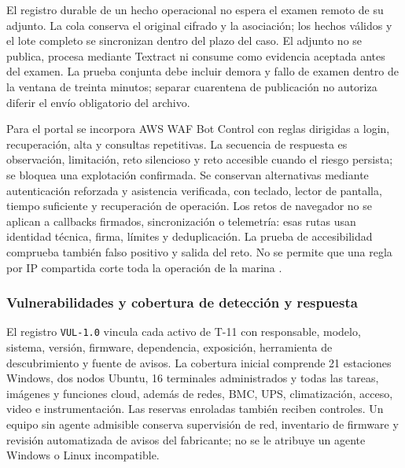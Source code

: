 El registro durable de un hecho operacional no espera el examen remoto de su adjunto. La cola conserva el original cifrado y la asociación; los hechos válidos y el lote completo se sincronizan dentro del plazo del caso. El adjunto no se publica, procesa mediante Textract ni consume como evidencia aceptada antes del examen. La prueba conjunta debe incluir demora y fallo de examen dentro de la ventana de treinta minutos; separar cuarentena de publicación no autoriza diferir el envío obligatorio del archivo.

Para el portal se incorpora AWS WAF Bot Control con reglas dirigidas a login, recuperación, alta y consultas repetitivas. La secuencia de respuesta es observación, limitación, reto silencioso y reto accesible cuando el riesgo persista; se bloquea una explotación confirmada. Se conservan alternativas mediante autenticación reforzada y asistencia verificada, con teclado, lector de pantalla, tiempo suficiente y recuperación de operación. Los retos de navegador no se aplican a callbacks firmados, sincronización o telemetría: esas rutas usan identidad técnica, firma, límites y deduplicación. La prueba de accesibilidad comprueba también falso positivo y salida del reto. No se permite que una regla por IP compartida corte toda la operación de la marina \parencites{sec-waf-bot,sec-waf-retos}.

\subsubsection{Vulnerabilidades y cobertura de detección y respuesta}
\label{sec:4-vulnerabilidades-rt}

El registro \texttt{VUL-1.0} vincula cada activo de T-11 con responsable, modelo, sistema, versión, firmware, dependencia, exposición, herramienta de descubrimiento y fuente de avisos. La cobertura inicial comprende 21 estaciones Windows, dos nodos Ubuntu, 16 terminales administrados y todas las tareas, imágenes y funciones cloud, además de redes, BMC, UPS, climatización, acceso, video e instrumentación. Las reservas enroladas también reciben controles. Un equipo sin agente admisible conserva supervisión de red, inventario de firmware y revisión automatizada de avisos del fabricante; no se le atribuye un agente Windows o Linux incompatible.

